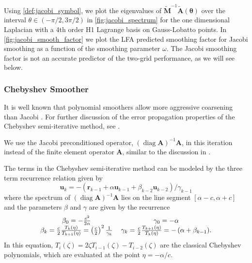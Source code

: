\documentclass[review]{siamart190516}
\DeclareMathOperator{\diag}{diag}
\begin{document}
Using \cref{def:jacobi_symbol}, we plot the eigenvalues of $\tilde{\mathbf{M}}^{-1} \tilde{\mathbf{A}} \left( \boldsymbol{\theta} \right)$ over the interval $\theta \in \left( - \pi / 2, 3 \pi / 2 \right)$ in \cref{fig:jacobi_spectrum} for the one dimensional Laplacian with a 4th order H1 Lagrange basis on Gauss-Lobatto points.
In \cref{fig:jacobi_smooth_factor} we plot the LFA predicted smoothing factor for Jacobi smoothing as a function of the smoothing parameter $\omega$.
The Jacobi smoothing factor is not an accurate predictor of the two-grid performance, as we will see below.

\subsubsection{Chebyshev Smoother}\label{sec:chebyshev}

It is well known that polynomial smoothers allow more aggressive coarsening than Jacobi \cite{brannick2015polynomial}.
For further discussion of the error propagation properties of the Chebyshev semi-iterative method, see \cite{gutknecht2002revisited}.

We use the Jacobi preconditioned operator, $\left( \diag {\mathbf{A}} \right)^{-1} {\mathbf{A}}$, in this iteration instead of the finite element operator ${\mathbf{A}}$, similar to the discussion in \cite{adams2003parallel}.

The terms in the Chebyshev semi-iterative method can be modeled by the three term recurrence relation given by
\begin{equation}
\mathbf{u}_k = - \left( \mathbf{r}_{k - 1} + \alpha \mathbf{u}_{k - 1} + \beta_{k - 2} \mathbf{u}_{k - 2} \right) / \gamma_{k - 1}
\label{eq:chebyshev_recursive}
\end{equation}
where the spectrum of $\left( \diag {\mathbf{A}} \right)^{-1} {\mathbf{A}}$ lies on the line segment $\left[ \alpha - c, \alpha + c \right]$ and the parameters $\beta$ and $\gamma$ are given by the recurrence
\begin{equation}
\begin{tabular}{c c}
$\beta_0 = - \frac{c^2}{2 \alpha}$ & $\gamma_0 = - \alpha$\\
$\beta_k = \frac{c}{2} \frac{T_k \left( \eta \right)}{T_{k + 1} \left( \eta \right)} = \left( \frac{c}{2} \right)^2 \frac{1}{\gamma_k}$ & $\gamma_k = \frac{c}{2} \frac{T_{k + 1} \left( \eta \right)}{T_k \left( \eta \right)} = - \left( \alpha + \beta_{k - 1} \right)$.
\end{tabular}
\end{equation}
In this equation, $T_i \left( \zeta \right) = 2 \zeta T_{i - 1} \left( \zeta \right) - T_{i - 2} \left( \zeta \right)$ are the classical Chebyshev polynomials, which are evaluated at the point $\eta = - \alpha / c$.
\end{document}
